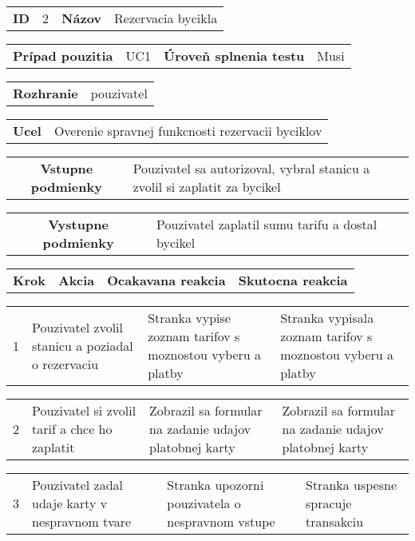 \begin{table}[h]
  \centering
  \begin{tabularx}{\mytablewidth}{|c|c|c|X|} 
      \hline 
      \textbf{ID} & 2 & \textbf{Názov} & Rezervacia bycikla
  \end{tabularx}

  \begin{tabularx}{\mytablewidth}{|c|c|c|X|} 
      \hline 
      \textbf{Prípad pouzitia} & UC1 & \textbf{Úroveň splnenia testu} & Musi
  \end{tabularx}

  \begin{tabularx}{\mytablewidth}{|c|X|} 
      \hline 
      \textbf{Rozhranie} & pouzivatel
  \end{tabularx}

  \begin{tabularx}{\mytablewidth}{|c|X|} 
      \hline 
      \textbf{Ucel} & Overenie spravnej funkcnosti rezervacii byciklov
  \end{tabularx}

  \begin{tabularx}{\mytablewidth}{|c|X|} 
      \hline 
      \textbf{Vstupne podmienky} & Pouzivatel sa autorizoval, vybral stanicu a zvolil si zaplatit za bycikel
  \end{tabularx}

  \begin{tabularx}{\mytablewidth}{|c|X|} 
      \hline 
      \textbf{Vystupne podmienky} & Pouzivatel zaplatil sumu tarifu a dostal bycikel
  \end{tabularx}

  \begin{tabularx}{\mytablewidth}{|p{2em}|X|X|X|} 
      \hline 
      \textbf{Krok} & \textbf{Akcia} & \textbf{Ocakavana reakcia} & \textbf{Skutocna reakcia}
  \end{tabularx}

  \begin{tabularx}{\mytablewidth}{|p{2em}|X|X|X|} 
      \hline 
      1 & 
      Pouzivatel zvolil stanicu a poziadal o rezervaciu & 
      Stranka vypise zoznam tarifov s moznostou vyberu a platby & 
      Stranka vypisala zoznam tarifov s moznostou vyberu a platby 
  \end{tabularx}
  \begin{tabularx}{\mytablewidth}{|p{2em}|X|X|X|} 
      \hline 
      2 & 
      Pouzivatel si zvolil tarif a chce ho zaplatit & 
      Zobrazil sa formular na zadanie udajov platobnej karty& 
      Zobrazil sa formular na zadanie udajov platobnej karty
  \end{tabularx}
  \begin{tabularx}{\mytablewidth}{|p{2em}|X|X|X|} 
      \hline 
      3 & 
      Pouzivatel zadal udaje karty v nespravnom tvare& 
      Stranka upozorni pouzivatela o nespravnom vstupe & 
      Stranka uspesne spracuje transakciu
  \end{tabularx}
  \begin{tabularx}{\mytablewidth}{|X|} 
      \hline
  \end{tabularx}
\end{table}


